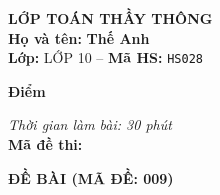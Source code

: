 \noindent
\begin{tcolorbox}[colback=white,colframe=black,arc=0mm,boxrule=0.8pt,top=4pt,bottom=4pt,left=6pt,right=6pt]
	\begin{minipage}[c]{0.44\textwidth}
		{\bfseries\large LỚP TOÁN THẦY THÔNG}\\[3pt]
		\textbf{Họ và tên:} \textbf{\large Thế Anh}\\[3pt]
		\textbf{Lớp:} LỚP 10 \quad -- \quad \textbf{Mã HS:} \texttt{HS028}
	\end{minipage}
	\hfill
	\begin{minipage}[c]{0.22\textwidth}
		\begin{tcolorbox}[colback=white,colframe=black,arc=0mm,boxrule=0.6pt,height=1.8cm,halign=center,valign=top,top=2pt]
			{\bfseries\normalsize Điểm}
		\end{tcolorbox}
	\end{minipage}
	\hfill
	\begin{minipage}[c]{0.30\textwidth}
		\raggedleft
		\textit{Thời gian làm bài: 30 phút}\\[4pt]
		\textbf{Mã đề thi:} 
	\end{minipage}
\end{tcolorbox}
\vspace{0.25cm}

\noindent\textbf{\large ĐỀ BÀI (MÃ ĐỀ: 009)}
\vspace{0.1cm}

